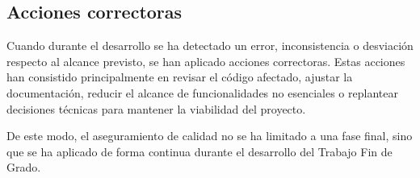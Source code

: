 \subsection{Acciones correctoras}

Cuando durante el desarrollo se ha detectado un error, inconsistencia o desviación respecto al alcance previsto, se han aplicado acciones correctoras. Estas acciones han consistido principalmente en revisar el código afectado, ajustar la documentación, reducir el alcance de funcionalidades no esenciales o replantear decisiones técnicas para mantener la viabilidad del proyecto.

De este modo, el aseguramiento de calidad no se ha limitado a una fase final, sino que se ha aplicado de forma continua durante el desarrollo del Trabajo Fin de Grado.
